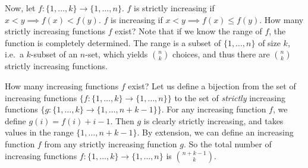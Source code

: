 Now, let \(f\colon \{1, \dots, k\} \to \{1, \dots, n\}\).
\(f\) is strictly increasing if \(x < y \implies f(x) < f(y)\).
\(f\) is increasing if \(x < y \implies f(x) \leq f(y)\).
How many strictly increasing functions \(f\) exist? Note that if we know the range of \(f\), the function is completely determined.
The range is a subset of \(\{1, \dots, n\}\) of size \(k\), i.e.\ a \(k\)-subset of an \(n\)-set, which yields \(\binom{n}{k}\) choices, and thus there are \(\binom{n}{k}\) strictly increasing functions.

How many increasing functions \(f\) exist? Let us define a bijection from the set of increasing functions \(\{f\colon \{1, \dots, k\} \to \{1, \dots, n\}\}\) to the set of \textit{strictly} increasing functions \(\{g\colon \{1, \dots, k\} \to \{1, \dots, n+k-1\}\}\).
For any increasing function \(f\), we define \(g(i) = f(i) + i - 1\).
Then \(g\) is clearly strictly increasing, and takes values in the range \(\{1, \dots, n+k-1\}\).
By extension, we can define an increasing function \(f\) from any strictly increasing function \(g\).
So the total number of increasing functions \(f\colon \{1, \dots, k\} \to \{1, \dots, n\}\) is \(\binom{n+k-1}{k}\).
